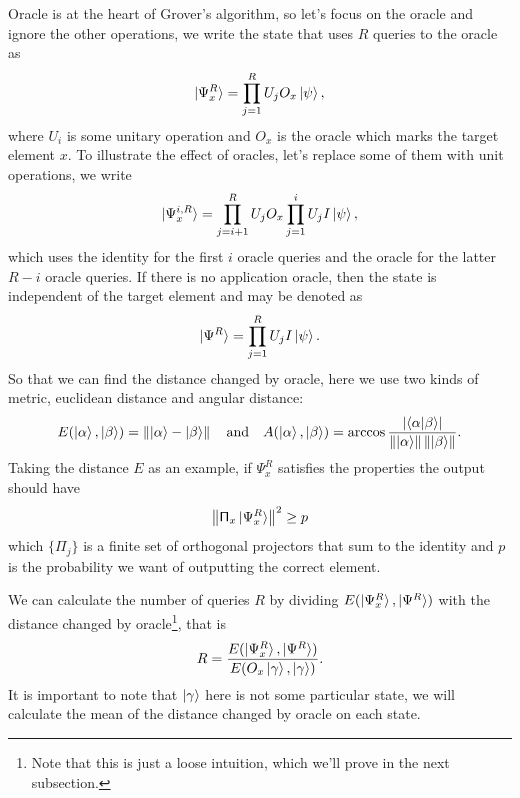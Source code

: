 \documentclass[a4paper,10pt]{book}
\numberwithin{equation}{section}
\begin{document}
Oracle is at the heart of Grover's algorithm, so let's focus on the oracle and ignore the other operations, we write the state that uses $R$ queries to the oracle as
\begin{equation}
    \ket{\Psi_{x}^{R}}=\prod_{j=1}^{R}U_{j}O_{x}\ket{\psi},
\end{equation}
where $U_{i}$ is some unitary operation and $O_{x}$ is the oracle which marks the target element $x$. To illustrate the effect of oracles, let's replace some of them with unit operations, we write
\begin{equation}
    \ket{\Psi_{x}^{i,R}}=\prod_{j=i+1}^{R}U_{j}O_{x}\prod_{j=1}^{i}U_{j}I\ket{\psi},
\end{equation}
which uses the identity for the first $i$ oracle queries and the oracle for the latter $R-i$ oracle queries. If there is no application oracle,  then the state is independent of the target element and may be denoted as
\begin{equation}
    \ket{\Psi^{R}}=\prod_{j=1}^{R}U_{j}I\ket{\psi}.
\end{equation}
So that we can find the distance changed by oracle, here we use two kinds of metric, euclidean distance and angular distance:
\begin{equation}
    E(\ket{\alpha},\ket{\beta})=\left\|\ket{\alpha}-\ket{\beta}\right\|
    \quad\text{and}\quad
    A(\ket{\alpha},\ket{\beta})=\arccos\frac{\left\lvert \braket{\alpha|\beta}\right\rvert}{\left\|\ket{\alpha}\right\|\left\|\ket{\beta}\right\|}.
\end{equation}
Taking the distance $E$ as an example, if $\Psi_{x}^{R}$ satisfies the properties the output should have
\begin{equation}\label{TheOutputWeWant}
    \left\| \mathsf{\Pi}_{x}\ket{\Psi_{x}^{R}} \right\|^{2} \geq p
\end{equation}
which $\{\mathsf{\Pi}_{j}\}$ is a finite set of orthogonal projectors that sum to the identity and $p$ is the probability we want of outputting the correct element.

We can calculate the number of queries $R$ by dividing $E(\ket{\Psi_{x}^{R}},\ket{\Psi^{R}})$ with the distance changed by oracle\footnote{Note that this is just a loose intuition, which we'll prove in the next subsection.}, that is
\begin{equation}\label{TheNumberForIteration}
    R=\frac{E(\ket{\Psi_{x}^{R}},\ket{\Psi^{R}})}{E(O_{x}\ket{\gamma},\ket{\gamma})}.
\end{equation}
It is important to note that $\ket{\gamma}$ here is not some particular state, we will calculate the mean of the distance changed by oracle on each state.
\end{document}
